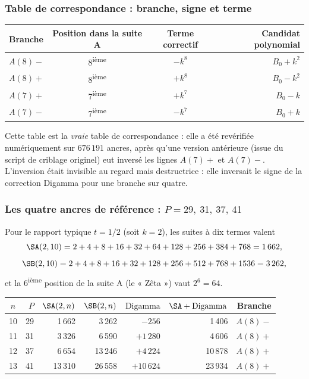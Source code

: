 \subsubsection{Table de correspondance : branche, signe et terme}

\begin{center}
\small
\begin{tabular}{@{}l c c r@{}}
\toprule
\rowcolor{spectralgris}
Branche & Position dans la suite A & Terme correctif & Candidat polynomial \\
\midrule
$A(8)-$ & 8\textsuperscript{ième} & $-k^{8}$ & $B_0+k^{2}$ \\
$A(8)+$ & 8\textsuperscript{ième} & $+k^{8}$ & $B_0-k^{2}$ \\
$A(7)+$ & 7\textsuperscript{ième} & $+k^{7}$ & $B_0-k$ \\
$A(7)-$ & 7\textsuperscript{ième} & $-k^{7}$ & $B_0+k$ \\
\bottomrule
\end{tabular}
\end{center}

Cette table est la \emph{vraie} table de correspondance : elle a été
revérifiée numériquement sur $676\,191$ ancres, après qu'une version
antérieure (issue du script de criblage originel) eut inversé les
lignes $A(7)+$ et $A(7)-$. L'inversion était invisible au regard mais
destructrice : elle inversait le signe de la correction Digamma pour
une branche sur quatre.

\subsubsection{Les quatre ancres de référence : $P = 29,\ 31,\ 37,\ 41$}

Pour le rapport typique $t = 1/2$ (soit $k = 2$), les suites à dix termes
valent
\[
  \SA(2,10) = 2+4+8+16+32+64+128+256+384+768 = 1\,662,
\]
\[
  \SB(2,10) = 2+4+8+16+32+128+256+512+768+1536 = 3\,262,
\]
et la 6\textsuperscript{ième} position de la suite A (le « Zêta ») vaut
$2^{6} = 64$.

\begin{center}
\small
\begin{tabular}{@{}c r r r r r r@{}}
\toprule
\rowcolor{spectralgris}
$n$ & $P$ & $\SA(2,n)$ & $\SB(2,n)$ & $\mathrm{Digamma}$ & $\SA+\mathrm{Digamma}$ & Branche \\
\midrule
10 & 29  & 1\,662   & 3\,262   & $-256$   & 1\,406   & $A(8)-$ \\
11 & 31  & 3\,326   & 6\,590   & $+1\,280$ & 4\,606   & $A(8)+$ \\
12 & 37  & 6\,654   & 13\,246  & $+4\,224$ & 10\,878  & $A(8)+$ \\
13 & 41  & 13\,310  & 26\,558  & $+10\,624$ & 23\,934  & $A(8)+$ \\
\bottomrule
\end{tabular}
\end{center}

